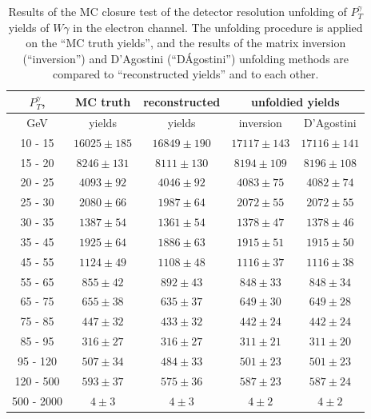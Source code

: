 \begin{table}[h]
  \scriptsize
  \begin{center}
  \caption{Results of the MC closure test of the detector resolution unfolding of $P_T^{\gamma}$ yields of $W\gamma$ in the electron channel. The unfolding procedure is applied on the ``MC truth yields'', and the results of the matrix inversion (``inversion'') and D'Agostini (``D\'Agostini'') unfolding methods are compared to ``reconstructed yields'' and to each other. }
  \begin{tabular}{|c|c|c|c|c|}
  \hline
  $P_T^{\gamma}$, &  MC truth         &   reconstructed          &  \multicolumn{2}{|c|}{unfoldied yields} \\ \hline
  GeV &  yields       &       yields        &  inversion &  D'Agostini \\ \hline
 10 -  15 &     $16025\pm 185$ &     $16849\pm 190$ &     $17117\pm143$ &     $17116\pm141$ \\ \hline
 15 -  20 &     $8246\pm 131$ &     $8111\pm 130$ &     $8194\pm109$ &     $8196\pm108$ \\ \hline
 20 -  25 &     $4093\pm  92$ &     $4046\pm  92$ &     $4083\pm75$ &     $4082\pm74$ \\ \hline
 25 -  30 &     $2080\pm  66$ &     $1987\pm  64$ &     $2072\pm55$ &     $2072\pm55$ \\ \hline
 30 -  35 &     $1387\pm  54$ &     $1361\pm  54$ &     $1378\pm47$ &     $1378\pm46$ \\ \hline
 35 -  45 &     $1925\pm  64$ &     $1886\pm  63$ &     $1915\pm51$ &     $1915\pm50$ \\ \hline
 45 -  55 &     $1124\pm  49$ &     $1108\pm  48$ &     $1116\pm37$ &     $1116\pm38$ \\ \hline
 55 -  65 &     $855\pm  42$ &     $892\pm  43$ &     $848\pm33$ &     $848\pm34$ \\ \hline
 65 -  75 &     $655\pm  38$ &     $635\pm  37$ &     $649\pm30$ &     $649\pm28$ \\ \hline
 75 -  85 &     $447\pm  32$ &     $433\pm  32$ &     $442\pm24$ &     $442\pm24$ \\ \hline
 85 -  95 &     $316\pm  27$ &     $316\pm  27$ &     $311\pm21$ &     $311\pm20$ \\ \hline
 95 - 120 &     $507\pm  34$ &     $484\pm  33$ &     $501\pm23$ &     $501\pm23$ \\ \hline
120 - 500 &     $593\pm  37$ &     $575\pm  36$ &     $587\pm23$ &     $587\pm24$ \\ \hline
500 - 2000 &     $4\pm   3$ &     $4\pm   3$ &     $4\pm2$ &     $4\pm2$ \\ \hline
  \end{tabular}
  \label{tab:unf_mc_closure_ELECTRON_WGamma}
  \end{center}
\end{table}

